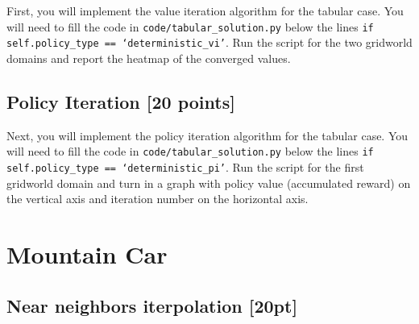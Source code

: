 \documentclass{article}
\begin{document}
First, you will implement the value iteration algorithm for the tabular case. You will need to fill the code in \texttt{code/tabular\_solution.py} below the lines \texttt{if self.policy\_type == `deterministic\_vi'}. Run the script for the two gridworld domains and report the heatmap of the converged values.






\newpage
\subsection{Policy Iteration [20 points]}

\begin{enumerate}[(a)]

Next, you will implement the policy iteration algorithm for the tabular case. You will need to fill the code in \texttt{code/tabular\_solution.py} below the lines \texttt{if self.policy\_type == `deterministic\_pi'}. Run the script for the first gridworld domain and turn in a graph with policy value (accumulated reward) on the vertical axis and iteration number on the horizontal axis.



\end{enumerate}


\newpage 
\section{Mountain Car}
\subsection{Near neighbors iterpolation [20pt]}
\end{document}
